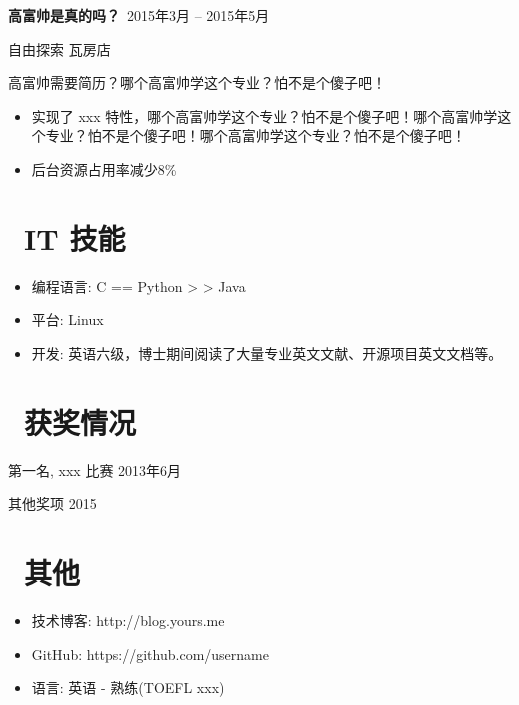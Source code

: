 \documentclass[11pt]{article}
\begin{document}
\textbf{高富帅是真的吗？}\  \hfill 2015年3月 -- 2015年5月

自由探索  \hfill 瓦房店

高富帅需要简历？哪个高富帅学这个专业？怕不是个傻子吧！
\begin{itemize}
  \item 实现了 xxx 特性，哪个高富帅学这个专业？怕不是个傻子吧！哪个高富帅学这个专业？怕不是个傻子吧！哪个高富帅学这个专业？怕不是个傻子吧！
  \item 后台资源占用率减少8\%
\end{itemize}


\section{\makebox[\widthof{\faGraduationCap}][c]{\color{CVBlue}\faCogs}\ IT 技能}
\begin{itemize}[parsep=0.5ex]
  \item 编程语言: C == Python > \Cpp > Java
  \item 平台: Linux
  \item 开发: 英语六级，博士期间阅读了大量专业英文文献、开源项目英文文档等。
\end{itemize}

\section{\makebox[\widthof{\faGraduationCap}][c]{\color{CVBlue}\faHeart}\ 获奖情况}
第一名, xxx 比赛 \hfill 2013年6月

其他奖项 \hfill 2015

\section{\makebox[\widthof{\faGraduationCap}][c]{\color{CVBlue}\faInfo}\ 其他}
\begin{itemize}[parsep=0.5ex]
  \item 技术博客: http://blog.yours.me
  \item GitHub: https://github.com/username
  \item 语言: 英语 - 熟练(TOEFL xxx)
\end{itemize}

\end{document}
